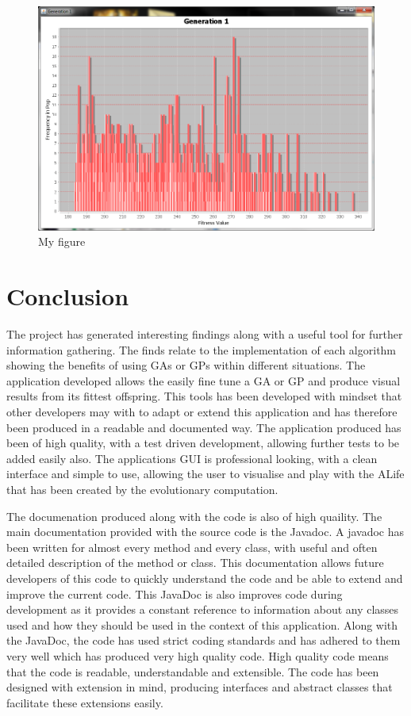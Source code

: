 \documentclass[12pt]{article}
\begin{document}
\begin{figure} [ht]
\centering
\includegraphics[scale = 0.25]{gen1-2500.png}
\caption{My figure}
\label{the-label-for-cross-referencing}
\end{figure}


\section{Conclusion}
The project has generated interesting findings along with a useful tool for further information gathering. The finds relate to the implementation of each algorithm
showing the benefits of using GAs or GPs within different situations. The application developed allows the easily fine tune a GA or GP and produce visual results 
from its fittest offspring. This tools has been developed with mindset that other developers may with to adapt or extend this application and has therefore
been produced in a readable and documented way. The application produced has been of high quality, with a test driven development, allowing further tests to be
added easily also. The applications GUI is professional looking, with a clean interface and simple to use, allowing the user to visualise and play with the 
ALife that has been created by the evolutionary computation.

The documenation produced along with the code is also of high quaility. The main documentation provided with the source code is the Javadoc. A javadoc has been 
written for almost every method and every class, with useful and often detailed description of the method or class. This documentation allows future developers
of this code to quickly understand the code and be able to extend and improve the current code. This JavaDoc is also improves code during development as it 
provides a constant reference to information about any classes used and how they should be used in the context of this application. 
Along with the JavaDoc, the code has used strict coding standards and has adhered to them very well which has produced very high quality code. High quality code
means that the code is readable, understandable and extensible. The code has been designed with extension in mind, producing interfaces and abstract classes
that facilitate these extensions easily. 
\end{document}
